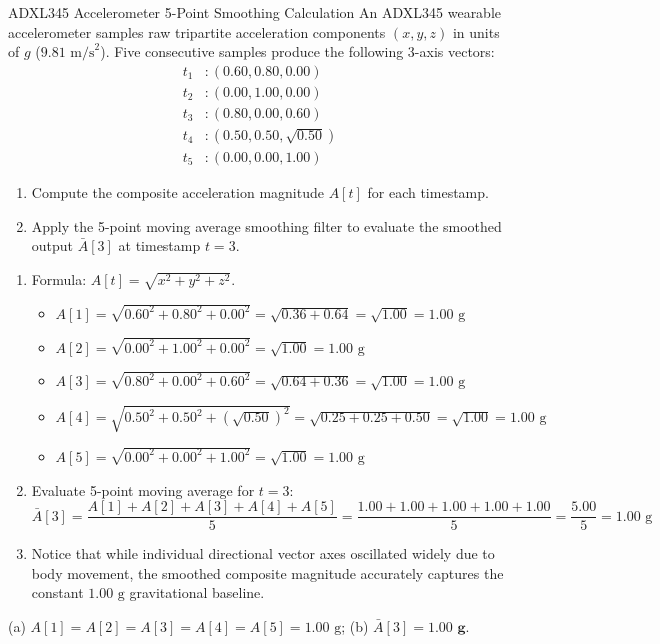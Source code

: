 \begin{solved}{ADXL345 Accelerometer 5-Point Smoothing Calculation}
\Given An ADXL345 wearable accelerometer samples raw tripartite acceleration components $(x, y, z)$ in units of $g$ ($9.81\text{ m/s}^2$). Five consecutive samples produce the following 3-axis vectors:
\begin{align*}
t_1 &: (0.60, 0.80, 0.00) \\
t_2 &: (0.00, 1.00, 0.00) \\
t_3 &: (0.80, 0.00, 0.60) \\
t_4 &: (0.50, 0.50, \sqrt{0.50}) \\
t_5 &: (0.00, 0.00, 1.00)
\end{align*}
\begin{enumerate}[label=(\alph*),leftmargin=*]
  \item Compute the composite acceleration magnitude $A[t]$ for each timestamp.
  \item Apply the 5-point moving average smoothing filter to evaluate the smoothed output $\bar{A}[3]$ at timestamp $t=3$.
\end{enumerate}
\Steps
\begin{enumerate}[leftmargin=*]
  \item Formula: $A[t] = \sqrt{x^2 + y^2 + z^2}$.
  \begin{itemize}
    \item $A[1] = \sqrt{0.60^2 + 0.80^2 + 0.00^2} = \sqrt{0.36 + 0.64} = \sqrt{1.00} = 1.00\text{ g}$
    \item $A[2] = \sqrt{0.00^2 + 1.00^2 + 0.00^2} = \sqrt{1.00} = 1.00\text{ g}$
    \item $A[3] = \sqrt{0.80^2 + 0.00^2 + 0.60^2} = \sqrt{0.64 + 0.36} = \sqrt{1.00} = 1.00\text{ g}$
    \item $A[4] = \sqrt{0.50^2 + 0.50^2 + (\sqrt{0.50})^2} = \sqrt{0.25 + 0.25 + 0.50} = \sqrt{1.00} = 1.00\text{ g}$
    \item $A[5] = \sqrt{0.00^2 + 0.00^2 + 1.00^2} = \sqrt{1.00} = 1.00\text{ g}$
  \end{itemize}
  \item Evaluate 5-point moving average for $t=3$:
  \begin{equation}
  \bar{A}[3] = \frac{A[1] + A[2] + A[3] + A[4] + A[5]}{5} = \frac{1.00 + 1.00 + 1.00 + 1.00 + 1.00}{5} = \frac{5.00}{5} = 1.00\text{ g}
  \end{equation}
  \item Notice that while individual directional vector axes oscillated widely due to body movement, the smoothed composite magnitude accurately captures the constant $1.00\text{ g}$ gravitational baseline.
\end{enumerate}
\Answer (a) $A[1]=A[2]=A[3]=A[4]=A[5]=1.00\text{ g}$; (b) $\bar{A}[3] = \mathbf{1.00\text{ g}}$.
\end{solved}

